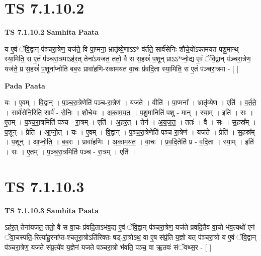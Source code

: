 \documentclass[17pt]{extarticle}
\begin{document}
\section*{ TS 7.1.10.2 }

\textbf{TS 7.1.10.2 } \newline
\textbf{Samhita Paata} \newline

य ए॒वं ॅवि॒द्वान् प॑ञ्चरा॒त्रेण॒ यज॑ते॒ वि पा॒प्मना॒ भ्रातृ॑व्ये॒णाऽऽ* व॑र्तते॒ सार्व॑सेनिः शौचे॒यो॑ऽकामयत पशु॒मान्थ् स्या॒मिति॒ स ए॒तं प॑ञ्चरा॒त्रमाऽह॑र॒त् तेना॑ऽयजत॒ ततो॒ वै स स॒हस्रं॑ प॒शून् प्राऽऽ*प्नो॒द्य ए॒वं ॅवि॒द्वान् प॑ञ्चरा॒त्रेण॒ यज॑ते॒ प्र स॒हस्रं॑ प॒शूना᳚प्नोति बब॒रः प्रावा॑हणि-रकामयत वा॒चः प्र॑वदि॒ता स्या॒मिति॒ स ए॒तं प॑ञ्चरा॒त्रमा - [  ] \newline

\textbf{Pada Paata} \newline

यः । ए॒वम् । वि॒द्वान् । प॒ञ्च॒रा॒त्रेणेति॑ पञ्च-रा॒त्रेण॑ । यज॑ते । वीति॑ । पा॒प्मना᳚ । भ्रातृ॑व्येण । एति॑ । व॒र्त॒ते॒ । सार्व॑सेनि॒रिति॒ सार्व॑ - से॒निः॒ । शौ॒चे॒यः । अ॒का॒म॒य॒त॒ । प॒शु॒मानिति॑ पशु - मान् । स्या॒म् । इति॑ । सः । ए॒तम् । प॒ञ्च॒रा॒त्रमिति॑ पञ्च - रा॒त्रम् । एति॑ । अ॒ह॒र॒त् । तेन॑ । अ॒य॒ज॒त॒ । ततः॑ । वै । सः । स॒हस्र᳚म् । प॒शून् । प्रेति॑ । आ॒प्नो॒त् । यः । ए॒वम् । वि॒द्वान् । प॒ञ्च॒रा॒त्रेणेति॑ पञ्च-रा॒त्रेण॑ । यज॑ते । प्रेति॑ । स॒हस्र᳚म् । प॒शून् । आ॒प्नो॒ति॒ । ब॒ब॒रः । प्रावा॑हणिः । अ॒का॒म॒य॒त॒ । वा॒चः । प्र॒व॒दि॒तेति॑ प्र - व॒दि॒ता । स्या॒म् । इति॑ । सः । ए॒तम् । प॒ञ्च॒रा॒त्रमिति॑ पञ्च - रा॒त्रम् । एति॑ ।  \newline




\section*{ TS 7.1.10.3 }

\textbf{TS 7.1.10.3 } \newline
\textbf{Samhita Paata} \newline

ऽह॑र॒त् तेना॑यजत॒ ततो॒ वै स वा॒चः प्र॑वदि॒ताऽभ॑व॒द्य ए॒वं ॅवि॒द्वान् प॑ञ्चरा॒त्रेण॒ यज॑ते प्रवदि॒तैव वा॒चो भ॑व॒त्यथो॑ एनं ॅवा॒चस्पति॒-रित्या॑हु॒रना᳚प्त-श्चतूरा॒त्रोऽति॑रिक्तः षड्-रा॒त्रोऽथ॒ वा ए॒ष स॑प्रं॒ति य॒ज्ञो यत् प॑ञ्चरा॒त्रो य ए॒वं ॅवि॒द्वान् प॑ञ्चरा॒त्रेण॒ यज॑ते संप्र॒त्ये॑व य॒ज्ञेन॑ यजते पञ्चरा॒त्रो भ॑वति॒ पञ्च॒ वा ऋ॒तवः॑ संॅवथ्स॒र - [  ] \newline
\end{document}
